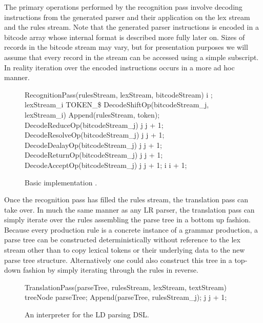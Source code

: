 \documentclass[a4paper,11pt]{article}
\begin{document}
The primary operations performed by the recognition pass involve decoding instructions from the generated parser and their application on the lex stream and the rules stream. 
Note that the generated parser instructions is encoded in a bitcode array whose internal format is described more fully later on.
Sizes of records in the bitcode stream may vary, but for presentation purposes we will assume that every record in the stream can be accessed using a simple subscript.
In reality iteration over the encoded instructions occurs in a more ad hoc manner.

\clearpage
\begin{figure}[!ht]
\begin{center}
\begin{gcl}
\PROC RecognitionPass(rulesStream, lexStream, bitcodeStream)
    i ;
    \DO lexStream_i \neq TOKEN\_\$ \rightarrow
      \DO DecodeShiftOp(bitcodeStream_j, lexStream_i) \rightarrow
      \quad Append(rulesStream, token);
      \BAR DecodeReduceOp(bitcodeStream_j) \rightarrow
      j \becomes j + 1;
      \BAR DecodeResolveOp(bitcodeStream_j) \rightarrow
      j \becomes j + 1;
      \BAR DecodeDealayOp(bitcodeStream_j) \rightarrow
      j \becomes j + 1;
      \BAR DecodeReturnOp(bitcodeStream_j) \rightarrow
      j \becomes j + 1;
      \BAR DecodeAcceptOp(bitcodeStream_j) \rightarrow
      j \becomes j + 1;
    \OD
    i \becomes i + 1;
  \OD
\CORP
\end{gcl}
\caption{Basic implementation .}
\end{center}
\end{figure}

Once the recognition pass has filled the rules stream, the translation pass can take over. 
In much the same manner as any LR parser, the translation pass can simply iterate over the rules assembling the parse tree in a bottom up fashion. 
Because every production rule is a concrete instance of a grammar production, a parse tree can be constructed deterministically without reference to the lex stream 
other than to copy lexical tokens or their underlying data to the new parse tree structure.
Alternatively one could also construct this tree in a top-down fashion by simply iterating through the rules in reverse.
\begin{figure}[!ht]
\begin{center}
\begin{gcl}
\PROC TranslationPass(parseTree, rulesStream, lexStream, textStream)
treeNode \becomes parseTree;
Append(parseTree, rulesStream_{j});
j \becomes j + 1;
\CORP
\end{gcl}
\caption{An interpreter for the LD parsing DSL.}
\end{center}
\end{figure}
\end{document}
